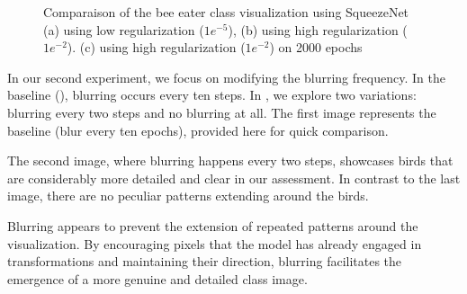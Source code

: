 \begin{figure}[H]
\begin{subfigure}[t]{.33\textwidth}
        \caption{}
        \label{fig:class_viz_reg:sub3}
    \end{subfigure}
    \caption{Comparaison of the bee eater class visualization using SqueezeNet (a) using low regularization ($ 1e^{-5} $), (b) using high regularization ($ 1e^{-2} $). (c) using high regularization ($ 1e^{-2} $) on 2000 epochs} %
    \label{fig:class_viz_reg}
\end{figure}


In our second experiment, we focus on modifying the blurring frequency. In the baseline (), blurring occurs every ten steps. In , we explore two variations: blurring every two steps and no blurring at all. The first image represents the baseline (blur every ten epochs), provided here for quick comparison.

The second image, where blurring happens every two steps, showcases birds that are considerably more detailed and clear in our assessment. In contrast to the last image, there are no peculiar patterns extending around the birds.

Blurring appears to prevent the extension of repeated patterns around the visualization. By encouraging pixels that the model has already engaged in transformations and maintaining their direction, blurring facilitates the emergence of a more genuine and detailed class image.

